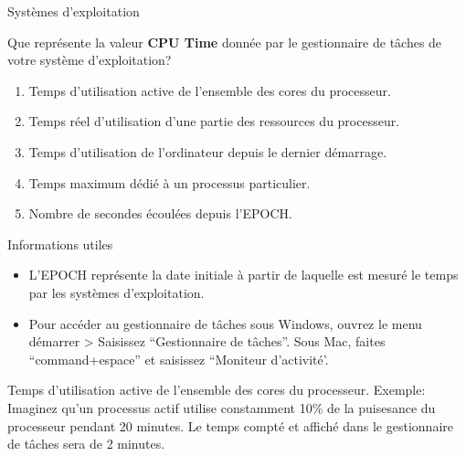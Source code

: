 \begin{section}{Systèmes d'exploitation}
    \begin{Exercice}[5 minutes]
        Que représente la valeur \textbf{CPU Time} donnée par le gestionnaire de tâches de votre système d'exploitation?
        \begin{enumerate}
            \item Temps d'utilisation active de l'ensemble des cores du processeur.
            \item Temps réel d'utilisation d'une partie des ressources du processeur.
            \item Temps d'utilisation de l'ordinateur depuis le dernier démarrage.
            \item Temps maximum dédié à un processus particulier.
            \item Nombre de secondes écoulées depuis l'EPOCH.
        \end{enumerate}
        \begin{Example}{\faLightbulb \quad Informations utiles}
            \begin{itemize}
                \item L'EPOCH représente la date initiale à partir de laquelle est mesuré le temps par les systèmes d'exploitation.
                \item Pour accéder au gestionnaire de tâches sous Windows, ouvrez le menu démarrer > Saisissez ``Gestionnaire de tâches''. Sous Mac, faites ``command+espace'' et saisissez ``Moniteur d'activité'.
            \end{itemize}
            
        \end{Example}
        \begin{solution}
            Temps d'utilisation active de l'ensemble des cores du processeur.
            Exemple: Imaginez qu'un processus actif utilise constamment 10\% de la puisesance du processeur pendant 20 minutes. Le temps compté et affiché dans le gestionnaire de tâches sera de 2 minutes.
        \end{solution}
    \end{Exercice}


\end{section}
